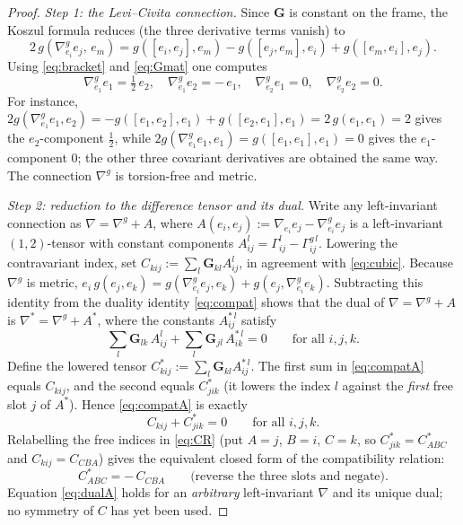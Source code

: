 \documentclass{amsart}
\theoremstyle{definition}
\theoremstyle{remark}
\begin{document}
\begin{proof}
\emph{Step 1: the Levi--Civita connection.}
Since $\mathbf G$ is constant on the frame, the Koszul formula reduces (the three derivative terms vanish) to
\[
2\,g(\nabla^{g}_{e_i}e_j,\,e_m)=g([e_i,e_j],e_m)-g([e_j,e_m],e_i)+g([e_m,e_i],e_j).
\]
Using \eqref{eq:bracket} and \eqref{eq:Gmat} one computes
\begin{equation}\label{eq:LC}
\nabla^{g}_{e_1}e_1=\tfrac12\,e_2,\quad
\nabla^{g}_{e_1}e_2=-\,e_1,\quad
\nabla^{g}_{e_2}e_1=0,\quad
\nabla^{g}_{e_2}e_2=0.
\end{equation}
For instance, $2g(\nabla^g_{e_1}e_1,e_2)=-g([e_1,e_2],e_1)+g([e_2,e_1],e_1)=2\,g(e_1,e_1)=2$ gives the
$e_2$-component $\tfrac12$, while $2g(\nabla^g_{e_1}e_1,e_1)=g([e_1,e_1],e_1)=0$ gives the $e_1$-component $0$;
the other three covariant derivatives are obtained the same way. The connection $\nabla^g$ is torsion-free and
metric.

\emph{Step 2: reduction to the difference tensor and its dual.}
Write any left-invariant connection as $\nabla=\nabla^{g}+A$, where
$A(e_i,e_j):=\nabla_{e_i}e_j-\nabla^g_{e_i}e_j$ is a left-invariant $(1,2)$-tensor with constant components
$A^{l}_{ij}=\Gamma^{l}_{ij}-\Gamma^{g\,l}_{ij}$. Lowering the contravariant index, set
$C_{kij}:=\sum_l \mathbf G_{kl}A^{l}_{ij}$, in agreement with \eqref{eq:cubic}.
Because $\nabla^g$ is metric, $e_i\,g(e_j,e_k)=g(\nabla^g_{e_i}e_j,e_k)+g(e_j,\nabla^g_{e_i}e_k)$. Subtracting
this identity from the duality identity \eqref{eq:compat} shows that the dual of $\nabla=\nabla^g+A$ is
$\nabla^{*}=\nabla^{g}+A^{*}$, where the constants $A^{*\,l}_{ij}$ satisfy
\begin{equation}\label{eq:compatA}
\sum_l\mathbf G_{lk}\,A^{l}_{ij}+\sum_l\mathbf G_{jl}\,A^{*\,l}_{ik}=0\qquad\text{for all }i,j,k.
\end{equation}
Define the lowered tensor $C^{*}_{kij}:=\sum_l\mathbf G_{kl}A^{*\,l}_{ij}$. The first sum in
\eqref{eq:compatA} equals $C_{kij}$, and the second equals $C^{*}_{jik}$ (it lowers the index $l$ against the
\emph{first} free slot $j$ of $A^*$). Hence \eqref{eq:compatA} is exactly
\begin{equation}\label{eq:CR}
C_{kij}+C^{*}_{jik}=0\qquad\text{for all }i,j,k.
\end{equation}
Relabelling the free indices in \eqref{eq:CR} (put $A=j$, $B=i$, $C=k$, so $C^*_{jik}=C^*_{ABC}$ and
$C_{kij}=C_{CBA}$) gives the equivalent closed form of the compatibility relation:
\begin{equation}\label{eq:dualA}
C^{*}_{ABC}=-\,C_{CBA}\qquad\text{(reverse the three slots and negate).}
\end{equation}
Equation \eqref{eq:dualA} holds for an \emph{arbitrary} left-invariant $\nabla$ and its unique dual; no symmetry
of $C$ has yet been used.


\end{proof}
\end{document}
